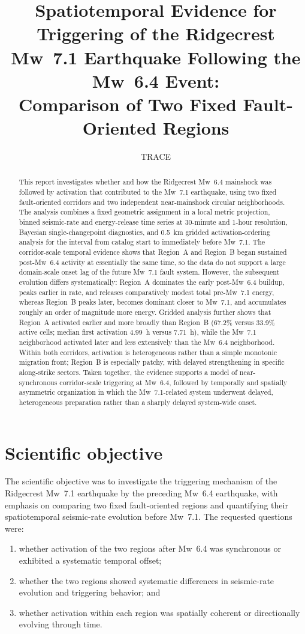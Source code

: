 \documentclass[11pt]{article}
\title{Spatiotemporal Evidence for Triggering of the Ridgecrest Mw~7.1 Earthquake Following the Mw~6.4 Event: \protect\\ Comparison of Two Fixed Fault-Oriented Regions}
\author{TRACE}
\date{}
\begin{document}
\maketitle

\begin{abstract}
This report investigates whether and how the Ridgecrest Mw~6.4 mainshock was followed by activation that contributed to the Mw~7.1 earthquake, using two fixed fault-oriented corridors and two independent near-mainshock circular neighborhoods. The analysis combines a fixed geometric assignment in a local metric projection, binned seismic-rate and energy-release time series at 30-minute and 1-hour resolution, Bayesian single-changepoint diagnostics, and 0.5~km gridded activation-ordering analysis for the interval from catalog start to immediately before Mw~7.1. The corridor-scale temporal evidence shows that Region~A and Region~B began sustained post-Mw~6.4 activity at essentially the same time, so the data do not support a large domain-scale onset lag of the future Mw~7.1 fault system. However, the subsequent evolution differs systematically: Region~A dominates the early post-Mw~6.4 buildup, peaks earlier in rate, and releases comparatively modest total pre-Mw~7.1 energy, whereas Region~B peaks later, becomes dominant closer to Mw~7.1, and accumulates roughly an order of magnitude more energy. Gridded analysis further shows that Region~A activated earlier and more broadly than Region~B (67.2\% versus 33.9\% active cells; median first activation 4.99~h versus 7.71~h), while the Mw~7.1 neighborhood activated later and less extensively than the Mw~6.4 neighborhood. Within both corridors, activation is heterogeneous rather than a simple monotonic migration front; Region~B is especially patchy, with delayed strengthening in specific along-strike sectors. Taken together, the evidence supports a model of near-synchronous corridor-scale triggering at Mw~6.4, followed by temporally and spatially asymmetric organization in which the Mw~7.1-related system underwent delayed, heterogeneous preparation rather than a sharply delayed system-wide onset.
\end{abstract}

\section{Scientific objective}
The scientific objective was to investigate the triggering mechanism of the Ridgecrest Mw~7.1 earthquake by the preceding Mw~6.4 earthquake, with emphasis on comparing two fixed fault-oriented regions and quantifying their spatiotemporal seismic-rate evolution before Mw~7.1. The requested questions were:
\begin{enumerate}[label=\arabic*)]
    \item whether activation of the two regions after Mw~6.4 was synchronous or exhibited a systematic temporal offset;
    \item whether the two regions showed systematic differences in seismic-rate evolution and triggering behavior; and
    \item whether activation within each region was spatially coherent or directionally evolving through time.
\end{enumerate}
\end{document}
